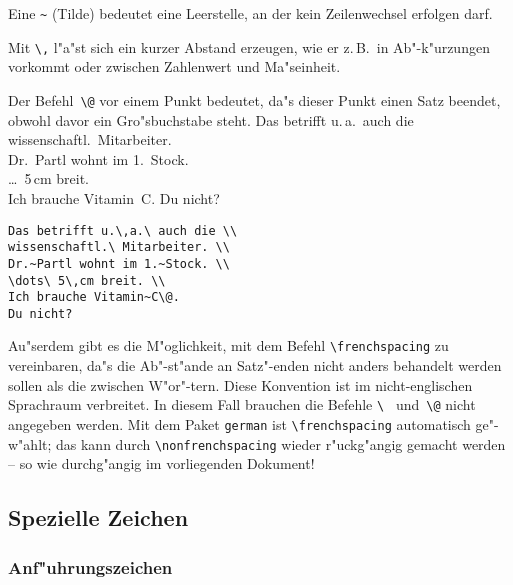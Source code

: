 Eine \verb|~| (Tilde) bedeutet eine Leerstelle,
an der kein Zeilenwechsel erfolgen darf.

Mit \verb|\,| l"a"st sich ein kurzer Abstand erzeugen, wie er
z.\,B.\ in Ab"-k"urzungen vorkommt oder zwischen Zahlenwert und Ma"seinheit.

Der Befehl~\verb|\@| vor einem Punkt bedeutet, da"s dieser Punkt
einen Satz beendet, obwohl davor ein Gro"sbuchstabe steht.
\exa
Das betrifft u.\,a.\ auch die \\
wissenschaftl.\ Mitarbeiter. \\
Dr.~Partl wohnt im 1.~Stock. \\
\dots\ 5\,cm breit. \\
Ich brauche Vitamin~C\@. Du nicht?
\exb
\begin{verbatim}
Das betrifft u.\,a.\ auch die \\
wissenschaftl.\ Mitarbeiter. \\
Dr.~Partl wohnt im 1.~Stock. \\
\dots\ 5\,cm breit. \\
Ich brauche Vitamin~C\@.
Du nicht?
\end{verbatim}
\exc
 
Au"serdem gibt es die M"oglichkeit, mit dem Befehl
\verb|\frenchspacing|
zu vereinbaren, da"s die Ab"-st"ande an Satz"-enden nicht anders
behandelt werden sollen als die zwischen W"or"-tern.
Diese Konvention ist im nicht-englischen Sprachraum verbreitet.
In diesem Fall brauchen die Befehle \verb|\ | und~\verb|\@| nicht
angegeben werden.
Mit dem Paket \texttt{german} ist \verb:\frenchspacing:
automatisch ge"-w"ahlt; das kann durch
\verb:\nonfrenchspacing:
wieder r"uckg"angig gemacht werden -- so wie durchg"angig im vorliegenden
Dokument!

 

\subsection{Spezielle Zeichen} \label{spezial}
 
\subsubsection{Anf"uhrungszeichen} \label{quotes}
 
